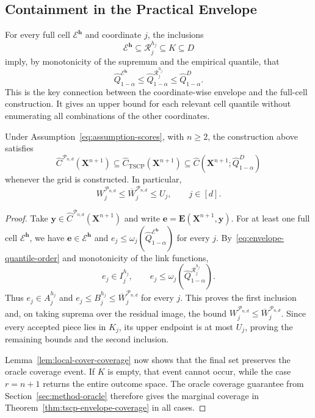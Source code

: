{\subsection{Containment in the Practical Envelope}\label{app:union-envelope-containment}

For every full cell $\mathcal E^{\mathbf h}$ and coordinate $j$, the inclusions
\[
\mathcal E^{\mathbf h}\subseteq\mathcal R_j^{h_j}\subseteq K\subseteq D
\]
imply, by monotonicity of the supremum and the empirical quantile, that
\begin{equation}\label{eq:envelope-quantile-order}
\hat Q^{\mathcal E^{\mathbf h}}_{1-\alpha}
\leq\hat Q^{\mathcal R_j^{h_j}}_{1-\alpha}
\leq\hat Q^D_{1-\alpha}.
\end{equation}
This is the key connection between the coordinate-wise envelope and the full-cell construction. It gives an upper bound for each relevant cell quantile without enumerating all combinations of the other coordinates.

\begin{lemma}\label{lem:full-cell-envelope-enclosure}
Under Assumption~\ref{eq:assumption-scores}, with $n\geq2$, the construction above satisfies
\[
\hat C^{\mathcal P_{n,d}}(\mathbf X^{n+1})
\subseteq\hat C_{\mathrm{TSCP}}(\mathbf X^{n+1})
\subseteq\hat C(\mathbf X^{n+1};\hat Q^D_{1-\alpha})
\]
whenever the grid is constructed. In particular,
\[
W_j^{\mathcal P_{n,d}}
\leq\overline W_j^{\mathcal P_{n,d}}\leq U_j,
\qquad j\in[d].
\]
\end{lemma}

\begin{proof}
Take $\mathbf y\in\hat C^{\mathcal P_{n,d}}(\mathbf X^{n+1})$ and write $\mathbf e=\mathbf E(\mathbf X^{n+1},\mathbf y)$. For at least one full cell $\mathcal E^{\mathbf h}$, we have $\mathbf e\in\mathcal E^{\mathbf h}$ and $e_j\leq\omega_j(\hat Q^{\mathcal E^{\mathbf h}}_{1-\alpha})$ for every $j$. By~\eqref{eq:envelope-quantile-order} and monotonicity of the link functions,
\[
e_j\in I_j^{h_j},
\qquad
e_j\leq\omega_j(\hat Q^{\mathcal R_j^{h_j}}_{1-\alpha}).
\]
Thus $e_j\in A_j^{h_j}$ and $e_j\leq B_j^{h_j}\leq\overline W_j^{\mathcal P_{n,d}}$ for every $j$. This proves the first inclusion and, on taking suprema over the residual image, the bound $W_j^{\mathcal P_{n,d}}\leq\overline W_j^{\mathcal P_{n,d}}$. Since every accepted piece lies in $K_j$, its upper endpoint is at most $U_j$, proving the remaining bounds and the second inclusion.

Lemma~\ref{lem:local-cover-coverage} now shows that the final set preserves the oracle coverage event. If $K$ is empty, that event cannot occur, while the case $r=n+1$ returns the entire outcome space. The oracle coverage guarantee from Section~\ref{sec:method-oracle} therefore gives the marginal coverage in Theorem~\ref{thm:tscp-envelope-coverage} in all cases.
\end{proof}

}
